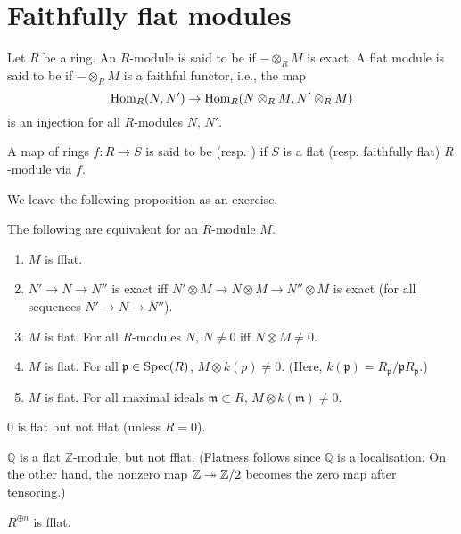 \documentclass[12pt]{article}
\begin{document}
\section{Faithfully flat modules}

\begin{defn}
	Let $R$ be a ring. An $R$-module is said to be  if $- \otimes_{R} M$ is exact. \newline
	A flat module is said to be  if $- \otimes_{R} M$ is a faithful functor, i.e., the map
	\begin{equation*} 
		\operatorname{Hom}_{R}(N, N') \to \operatorname{Hom}_{R}(N \otimes_{R} M, N' \otimes_{R} M)
	\end{equation*}
	is an injection for all $R$-modules $N$, $N'$.

	A map of rings $f : R \to S$ is said to be  (resp. ) if $S$ is a flat (resp. faithfully flat) $R$-module via $f$.
\end{defn}

We leave the following proposition as an exercise.

\begin{prop} \label{prop:equiv-fflat}
	The following are equivalent for an $R$-module $M$.
	\begin{enumerate}
		\item $M$ is fflat.
		\item $N' \to N \to N''$ is exact iff $N' \otimes M \to N \otimes M \to N'' \otimes M$ is exact (for all sequences $N' \to N \to N''$).
		\item $M$ is flat. For all $R$-modules $N$, $N \neq 0$ iff $N \otimes M \neq 0$.
		\item $M$ is flat. For all $\mathfrak{p} \in \operatorname{Spec}(R)$, $M \otimes k(p) \neq 0$. (Here, $k(\mathfrak{p}) = R_{\mathfrak{p}}/\mathfrak{p} R_{\mathfrak{p}}$.)
		\item \label{item:fflat-5} $M$ is flat. For all maximal ideals $\mathfrak{m} \subset R$, $M \otimes k(\mathfrak{m}) \neq 0$.
	\end{enumerate}
\end{prop}

\begin{ex}
	$0$ is flat but not fflat (unless $R = 0$).

	$\mathbb{Q}$ is a flat $\mathbb{Z}$-module, but not fflat. (Flatness follows since $\mathbb{Q}$ is a localisation. On the other hand, the nonzero map $\mathbb{Z} \twoheadrightarrow \mathbb{Z}/2$ becomes the zero map after tensoring.)

	$R^{\oplus n}$ is fflat.
\end{ex}
\end{document}
